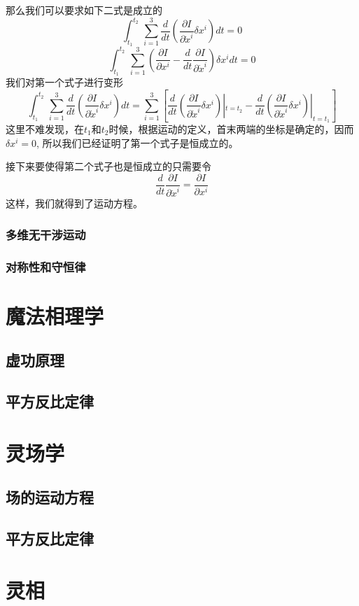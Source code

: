 \documentclass[UTF8,12pt]{ctexart}
\begin{document}
            那么我们可以要求如下二式是成立的
            \begin{equation}
            \int_{t_1}^{t_2}\,\sum_{i=1}^3\frac{d}{dt}(\frac{\partial I}{\partial \dot{x}^i}\delta x^i)dt=0
            \end{equation}
            \begin{equation}
            \int_{t_1}^{t_2}\,\sum_{i=1}^3(\frac{\partial I}{\partial x^i}-\frac{d}{dt}\frac{\partial I}{\partial \dot{x}^i})\delta x^i dt=0
            \end{equation}
            我们对第一个式子进行变形
            \begin{equation}
            \int_{t_1}^{t_2}\,\sum_{i=1}^3\frac{d}{dt}(\frac{\partial I}{\partial \dot{x}^i}\delta x^i)dt=
            \sum_{i=1}^3[\frac{d}{dt}(\frac{\partial I}{\partial \dot{x}^i}\delta x^i)|_{t=t_2}-\frac{d}{dt}(\frac{\partial I}{\partial \dot{x}^i}\delta x^i)|_{t=t_1}]
            \end{equation}
            这里不难发现，在$t_1$和$t_2$时候，根据运动的定义，首末两端的坐标是确定的，因而$\delta x^i=0$,
            所以我们已经证明了第一个式子是恒成立的。
            
            接下来要使得第二个式子也是恒成立的只需要令
            \begin{equation}
            \frac{d}{dt}\frac{\partial I}{\partial \dot{x}^i}=\frac{\partial I}{\partial x^i}
            \end{equation}
            这样，我们就得到了运动方程。



            \subsubsection{多维无干涉运动}

            \subsubsection{对称性和守恒律}
    
    \section{魔法相理学}
         \subsection{虚功原理}

         \subsection{平方反比定律}


    \section{灵场学}
        \subsection{场的运动方程}

        \subsection{平方反比定律}

    \section{灵相}
\end{document}
